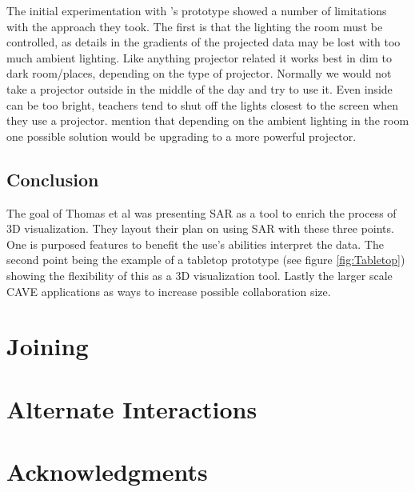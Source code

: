 \documentclass{sig-alternate}
\begin{document}
The initial experimentation with \cite{3D}'s prototype showed a number of limitations with the approach they took. The first is that the lighting the room must be controlled, as details in the gradients of the projected data may be lost with too much ambient lighting. Like anything projector related it works best in dim to dark room/places, depending on the type of projector. Normally we would not take a projector outside in the middle of the day and try to use it. Even inside can be too bright, teachers tend to shut off the lights closest to the screen when they use a projector. \cite{3D} mention that depending on the ambient lighting in the room one possible solution would be upgrading to a more powerful projector.  

\subsection{Conclusion}
\label{sec:Conclusion}

The goal of Thomas et al \cite{3D} was presenting SAR as a tool to enrich the process of 3D visualization. They layout their plan on using SAR with these three points. One is purposed features to benefit the use's abilities interpret the data. The second point being the example of a tabletop prototype (see figure \ref{fig:Tabletop}) showing the flexibility of this as a 3D visualization tool. Lastly the larger scale CAVE applications as ways to increase possible collaboration size.      


\section{Joining}
\label{sec:Joining}

\section{Alternate Interactions}
\label{sec:Alternate Interactions}

\section{Acknowledgments}
\label{sec:Acknowledgments}



\end{document}
